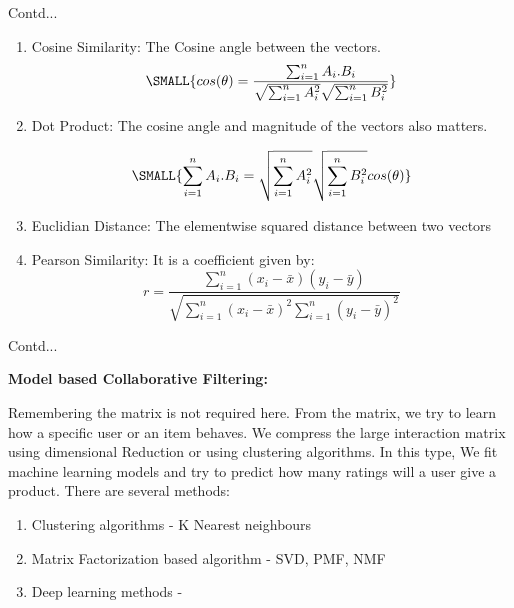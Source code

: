 \documentclass{beamer}
\newcommand\myheading[1]{%
  \par\bigskip
  {\large\bfseries#1}\par\smallskip}
\begin{document}
\begin{frame}{Contd...}
	\begin{enumerate}
		\item Cosine Similarity: The Cosine angle between the vectors.
		\begin{equation*}
			\SMALL{cos(\theta) = \frac{\sum_{i=1}^{n} A_i . B_i}{\sqrt{\sum_{i=1}^{n}A_i^2}\sqrt{\sum_{i=1}^{n}B_i^2}}}
		\end{equation*}
		\item Dot Product: The cosine angle and magnitude of the vectors also matters.
		
		\begin{equation*}
			\SMALL{\sum_{i=1}^{n} A_i . B_i = \sqrt{\sum_{i=1}^{n}A_i^2}\sqrt{\sum_{i=1}^{n}B_i^2} cos(\theta)}
		\end{equation*}
		\item Euclidian Distance: The elementwise squared distance between two vectors
		\item Pearson Similarity: It is a coefficient given by:
		\begin{equation*}
			r = \frac{\sum_{i=1}^{n}(x_i - \bar{x})(y_i - \bar{y})}{\sqrt{\sum_{i=1}^{n}(x_i - \bar{x})^2 \sum_{i=1}^{n}(y_i - \bar{y})^2}}
		\end{equation*}
	\end{enumerate}
\end{frame}

\begin{frame}{Contd...}
	\begin{flushleft}
		\myheading{Model based Collaborative Filtering:}
			Remembering the matrix is not required here. From the matrix, we try to learn how a specific user or an item behaves. We compress the large interaction matrix using dimensional Reduction or using clustering algorithms. In this type, We fit machine learning models and try to predict how many ratings will a user give a product. There are several methods:
			\begin{enumerate}
				\item Clustering algorithms - K Nearest neighbours
				\item Matrix Factorization based algorithm - SVD, PMF, NMF
				\item Deep learning methods - 
			\end{enumerate}
	\end{flushleft}
\end{frame}
\end{document}
